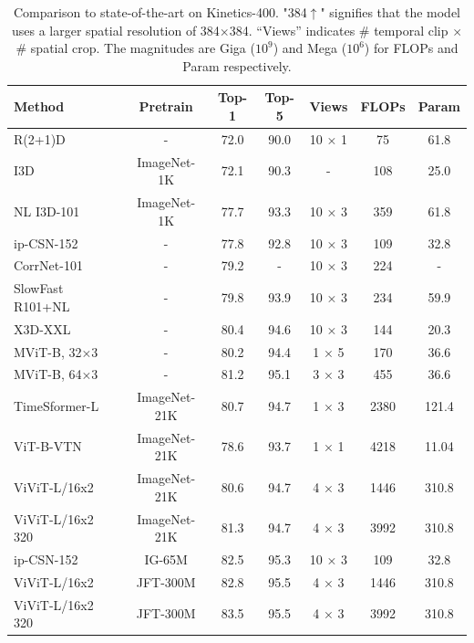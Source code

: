 \documentclass{article}
\newcommand{\demph}[1]{\textcolor[rgb]{0.565,0.565,0.565}{#1}}
\begin{document}
\begin{table}[t]
\caption{Comparison to state-of-the-art on Kinetics-400. "384$\uparrow$" signifies that the model uses a larger spatial resolution of 384$\times$384. “Views” indicates \# temporal clip $\times$ \# spatial crop. The magnitudes are Giga ($10^{9}$) and Mega ($10^{6}$) for FLOPs and Param respectively.}
\centering
  \begin{tabular}{l|c|cc|c|cc}
\Xhline{1.0pt}
  Method & Pretrain & Top-1 & Top-5 & Views & FLOPs & Param  \\
  \hline
  R(2+1)D~\cite{tran2018closer} & - & 72.0 & 90.0 & 10 × 1 & 75 & 61.8 \\
  I3D~\cite{carreira2017quo} & ImageNet-1K & 72.1 & 90.3 & - & 108 & 25.0 \\
  NL I3D-101~\cite{wang2018non} & ImageNet-1K & 77.7 & 93.3 & 10 × 3 & 359 & 61.8\\
  ip-CSN-152~\cite{tran2019video} & - & 77.8 & 92.8 & 10 × 3 & 109 & 32.8 \\
  CorrNet-101~\cite{wang2020video} & - & 79.2 & - & 10 × 3 & 224 & - \\
  SlowFast R101+NL~\cite{feichtenhofer2019slowfast} & - & 79.8 & 93.9 & 10 × 3 & 234 & 59.9 \\
  X3D-XXL~\cite{feichtenhofer2020x3d} & - & 80.4 & 94.6 & 10 × 3 & 144 &20.3 \\
  \hline
  MViT-B, 32×3~\cite{fan2021multiscale} & - & 80.2 & 94.4 & 1 × 5 & 170 & 36.6 \\
  MViT-B, 64×3~\cite{fan2021multiscale} & - & 81.2 & 95.1 & 3 × 3 & 455 & 36.6\\
  TimeSformer-L~\cite{timesformer2021} & ImageNet-21K & 80.7 & 94.7 & 1 × 3 & 2380 & 121.4\\
  ViT-B-VTN~\cite{neimark2021VTN} & ImageNet-21K & 78.6 & 93.7 & 1 × 1 &4218 & 11.04\\
  ViViT-L/16x2~\cite{arnab2021vivit} & ImageNet-21K & 80.6 & 94.7 & 4 × 3 &1446 & 310.8\\
  ViViT-L/16x2 320~\cite{arnab2021vivit} & ImageNet-21K & 81.3 & 94.7 & 4 × 3 & 3992 & 310.8\\
  \demph{ip-CSN-152~\cite{tran2019video}} & \demph{IG-65M} & \demph{82.5} & \demph{95.3} & \demph{10 × 3} & \demph{109} & \demph{32.8} \\
  \demph{ViViT-L/16x2~\cite{arnab2021vivit}} & \demph{JFT-300M} & \demph{82.8} & \demph{95.5} & \demph{4 × 3} & \demph{1446} & \demph{310.8} \\
  \demph{ViViT-L/16x2 320~\cite{arnab2021vivit}} & \demph{JFT-300M} & \demph{83.5} & \demph{95.5} & \demph{4 × 3} &\demph{3992} & \demph{310.8}\\

\end{tabular}
\end{table}
\end{document}
